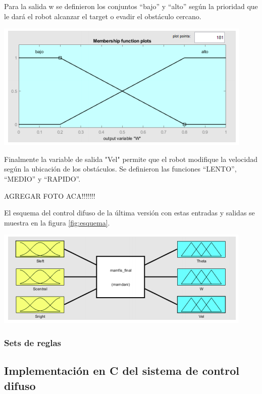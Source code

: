 Para la salida w se definieron los conjuntos “bajo” y “alto” según la prioridad que le dará el robot alcanzar el target o evadir el obstáculo cercano.

\begin{center}
    \includegraphics[scale=0.5]{Tesis/Capitulos/04_CAPITULO_2/img/varfuzzy3.png}
\end{center}

Finalmente la variable de salida "Vel" permite que el robot modifique la velocidad según la ubicación de los obstáculos. Se definieron las funciones “LENTO”, “MEDIO” y “RAPIDO”. 

AGREGAR FOTO ACA!!!!!!!

El esquema del control difuso de la última versión con estas entradas y salidas se muestra en la figura \ref{fig:esquema}.

\begin{center}
    \includegraphics[scale=0.5]{Tesis/Capitulos/04_CAPITULO_2/img/varfuzzy4.png}
    \label{fig:esquema}
\end{center}

\subsubsection{Sets de reglas}


\subsection{Implementación en C del sistema de control difuso}
